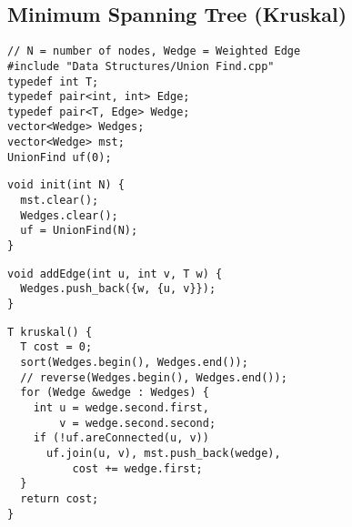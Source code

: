 \documentclass[twoside]{article}
\newcommand{\fileTitleStyle}{\large\underline}
\begin{document}
\begin{multicols*}{2}
\subsection*{Minimum Spanning Tree (Kruskal)}
\begin{verbatim}
// N = number of nodes, Wedge = Weighted Edge
#include "Data Structures/Union Find.cpp"
typedef int T;
typedef pair<int, int> Edge;
typedef pair<T, Edge> Wedge;
vector<Wedge> Wedges;
vector<Wedge> mst;
UnionFind uf(0);
\end{verbatim}
\vspace{-12pt}
\begin{verbatim}
void init(int N) {
  mst.clear();
  Wedges.clear();
  uf = UnionFind(N);
}
\end{verbatim}
\vspace{-12pt}
\begin{verbatim}
void addEdge(int u, int v, T w) {
  Wedges.push_back({w, {u, v}});
}
\end{verbatim}
\vspace{-12pt}
\begin{verbatim}
T kruskal() {
  T cost = 0;
  sort(Wedges.begin(), Wedges.end());
  // reverse(Wedges.begin(), Wedges.end());
  for (Wedge &wedge : Wedges) {
    int u = wedge.second.first,
        v = wedge.second.second;
    if (!uf.areConnected(u, v))
      uf.join(u, v), mst.push_back(wedge),
          cost += wedge.first;
  }
  return cost;
}
\end{verbatim}

\subsectionfont{\centering\bfseries\LARGE}
\subsectionfont{\fileTitleStyle}

\end{multicols*}
\end{document}
